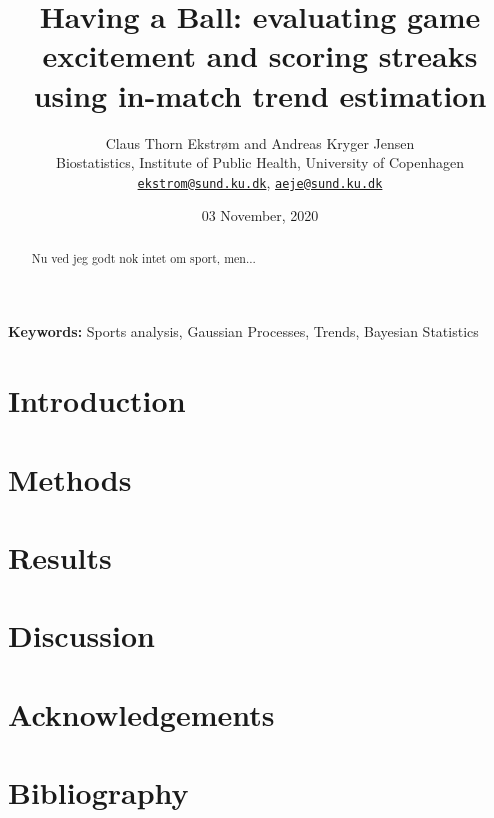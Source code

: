 \documentclass[
  11pt,
]{article}
\title{Having a Ball: evaluating game excitement and scoring streaks using
in-match trend estimation}
\author{Claus Thorn Ekstrøm and Andreas Kryger Jensen\\
Biostatistics, Institute of Public Health, University of Copenhagen\\
\href{mailto:ekstrom@sund.ku.dk}{\nolinkurl{ekstrom@sund.ku.dk}},
\href{mailto:aeje@sund.ku.dk}{\nolinkurl{aeje@sund.ku.dk}}}
\date{03 November, 2020}
\theoremstyle{nonumberplain}
\begin{document}
\maketitle

\begin{abstract}
Nu ved jeg godt nok intet om sport, men...
\end{abstract}

\begin{center}
\textbf{Keywords:} Sports analysis, Gaussian Processes, Trends, Bayesian Statistics
\end{center}

\hypertarget{introduction}{%
\section{Introduction}\label{introduction}}

\hypertarget{sec:method}{%
\section{Methods}\label{sec:method}}

\hypertarget{sec:application}{%
\section{Results}\label{sec:application}}

\hypertarget{sec:discussion}{%
\section{Discussion}\label{sec:discussion}}

\hypertarget{acknowledgements}{%
\section*{Acknowledgements}\label{acknowledgements}}

\hypertarget{bibliography}{%
\section*{Bibliography}\label{bibliography}}

\hypertarget{refs}{}
\end{document}
